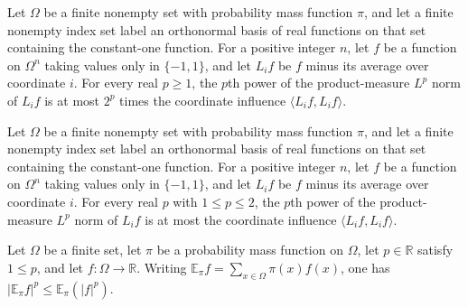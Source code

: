 \begin{theorem}
\label{FABL.FiniteFourierBasis.productLpNorm_laplacian_rpow_le_two_rpow_influence}
\leanok
{}
Let $\Omega$ be a finite nonempty set with probability mass function $\pi$, and let a
finite nonempty index set label an orthonormal basis of real functions on that set
containing the constant-one function. For a positive integer $n$, let $f$ be a function
on $\Omega^n$ taking values only in $\{-1,1\}$, and let $L_i f$ be $f$ minus its average over
coordinate $i$. For every real $p\geq1$, the $p$th power of the product-measure $L^p$
norm of $L_i f$ is at most $2^p$ times the coordinate influence $\langle L_i f,L_i
f\rangle$.
\end{theorem}

\begin{theorem}
\label{FABL.FiniteFourierBasis.productLpNorm_laplacian_rpow_le_influence}
\leanok
{}
Let $\Omega$ be a finite nonempty set with probability mass function $\pi$, and let a
finite nonempty index set label an orthonormal basis of real functions on that set
containing the constant-one function. For a positive integer $n$, let $f$ be a function
on $\Omega^n$ taking values only in $\{-1,1\}$, and let $L_i f$ be $f$ minus its average over
coordinate $i$. For every real $p$ with $1\leq p\leq2$, the $p$th power of the
product-measure $L^p$ norm of $L_i f$ is at most the coordinate influence $\langle L_i
f,L_i f\rangle$.
\end{theorem}

\begin{theorem}
\label{FABL.abs_pmfExpectation_rpow_le}
\leanok
{}
Let $\Omega$ be a finite set, let $\pi$ be a probability mass function on $\Omega$, let
$p\in\mathbb R$ satisfy $1\le p$, and let $f:\Omega\to\mathbb R$. Writing $\mathbb E_\pi
f=\sum_{x\in\Omega}\pi(x)f(x)$, one has $|\mathbb E_\pi f|^p\le \mathbb E_\pi(|f|^p)$.
\end{theorem}

